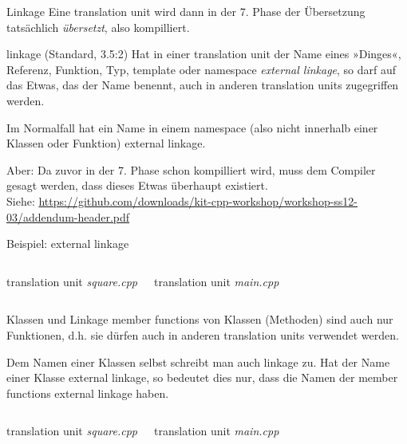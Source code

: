 \begin{frame}{Linkage}
	Eine translation unit wird dann in der 7. Phase der Übersetzung tatsächlich \emph{übersetzt}, also kompilliert.
	
	\vspace{1em}
	
	\begin{block}{linkage (Standard, 3.5:2)}
		Hat in einer translation unit der Name eines »Dinges«, Referenz, Funktion, Typ, template oder namespace \emph{external linkage}, so darf auf das Etwas, das der Name benennt, auch in anderen translation units zugegriffen werden.
	\end{block}
	Im Normalfall hat ein Name in einem namespace (also nicht innerhalb einer Klassen oder Funktion) external linkage.
	
	\vspace{1em}
	\pause
	
	Aber: Da zuvor in der 7. Phase schon kompilliert wird, muss dem Compiler gesagt werden, dass dieses Etwas überhaupt existiert.\\
	\tiny
	Siehe: \url{https://github.com/downloads/kit-cpp-workshop/workshop-ss12-03/addendum-header.pdf}
\end{frame}

\begin{frame}{Beispiel: external linkage}
	\footnotesize
	\begin{columns}[t]
		translation unit \emph{square.cpp}
		\vspace{1em}
		
		
		\pause
		
		translation unit \emph{main.cpp}
		\vspace{1em}
		
	\end{columns}
\end{frame}

\begin{frame}{Klassen und Linkage}
	member functions von Klassen (Methoden) sind auch nur Funktionen, d.h. sie dürfen auch in anderen translation units verwendet werden.
	
	Dem Namen einer Klassen selbst schreibt man auch linkage zu. Hat der Name einer Klasse external linkage, so bedeutet dies nur, dass die Namen der member functions external linkage haben.
	
	\pause
	\vspace{1em}
	
	\footnotesize
	\begin{columns}[t]
		translation unit \emph{square.cpp}
		\vspace{1em}
		
		
		\pause
		translation unit \emph{main.cpp}
		\vspace{1em}
		
	\end{columns}
\end{frame}

